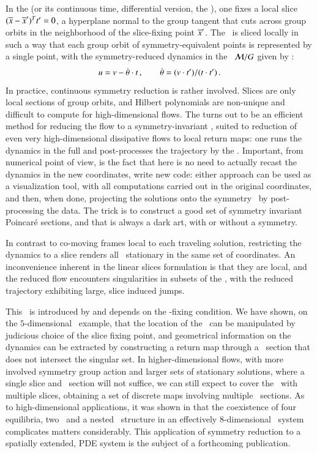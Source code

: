\documentclass[preprint,number,sort&compress]{elsarticle}
\begin{document}
In the \emph{\mframes} (or its continuous time, differential
version, the \emph{\mslices}), one fixes a local slice
$(\overline{x} - {\overline{x}'} )^T t' =0$, a hyperplane normal
to the group tangent \sliceTan{} that cuts across group
orbits in the neighborhood of the slice-fixing point
${\overline{x}'}$. The \statesp\ is sliced locally in such a way
that each group orbit of symmetry-equivalent points is
represented by a single point, with the symmetry-reduced
dynamics in the \reducedsp\ ${\cal M}/G$ given by
:
\[
u = v - \dot{{\bf \theta}}  \cdot t
    \,,\qquad
\dot{{\bf \theta}} = (v \cdot t')/(t \cdot t')
\,.
\]
In practice, continuous symmetry reduction is rather
involved. Slices are only local sections of group orbits, and
Hilbert polynomials are non-unique and difficult to compute
for high-dimensional flows.
The {\mframes}
turns out to be an efficient method for reducing the
flow to a symmetry-in\-vari\-ant \reducedsp, suited to reduction
of {even very high-dimensional}
dissipative flows to local return maps:
one runs the dynamics in the full \statesp and
post-processes the trajectory by the \mframes.
Important, from numerical point of  view, is the
fact that here is no need to
actually recast the dynamics in the new coordinates,
write new code: either
approach can be used as a visualization tool, with all
computations carried out in the original coordinates, and
then, when done, projecting the solutions onto the symmetry
\reducedsp\ by post-processing the data. The trick is to
construct a good set of symmetry in\-vari\-ant Poincar\'e
sections, and that is always a dark art, with or without a
symmetry.

In contrast to co-moving frames local to each traveling
solution, {restricting the dynamics}
to a slice renders all \reqva\
stationary in the same set of coordinates. An inconvenience
inherent in the linear slices formulation is that they are
local, and the reduced flow encounters singularities in
subsets of the \reducedsp, with the reduced trajectory exhibiting
large, slice induced jumps.

This \sset\ is introduced by and
depends on the \slice-fixing condition. We have shown,
on the $5$-dimensional \cLe\ example, that the location of
the \sset\ can be manipulated by judicious choice of the slice
fixing point, and geometrical information on the dynamics can
be extracted by constructing a return map through a
\Poincare\ section that does not intersect the singular set.
In higher-dimensional flows, with more involved symmetry
group action and larger sets of stationary solutions, where a
single slice and \Poincare\ section will not suffice, we can
still expect to cover the \reducedsp\ with multiple slices,
obtaining a set of discrete maps involving multiple
\Poincare\ sections. As to high-dimensional applications,
it was shown in  that the coexistence
of four equilibria, two \reqva\ and a nested \fixedsp\
structure in an effectively $8$-dimensional \KS\
system complicates matters considerably. This
application of symmetry reduction to a spatially extended,
PDE system is the
subject of a forthcoming publication\rf{SCD09b}.
\end{document}
